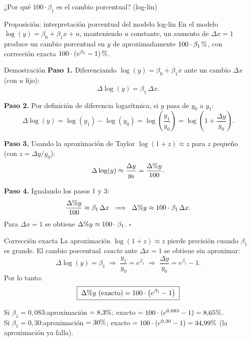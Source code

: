 \documentclass{beamer}
\newcommand{\pc}{\text{\char37}}
\begin{document}
\begin{frame}[allowframebreaks]{¿Por qué $100\cdot\beta_1$ es el cambio porcentual? (log-lin)}

\begin{alertblock}{Proposición: interpretación porcentual del modelo log-lin}
En el modelo $\log(y) = \beta_0 + \beta_1 x + u$, manteniendo $u$ constante, un aumento de $\Delta x = 1$ produce un cambio porcentual en $y$ de aproximadamente $100\cdot\beta_1\,\pc$, con corrección exacta $100\cdot(e^{\beta_1}-1)\,\pc$.
\end{alertblock}

\begin{exampleblock}{Demostración}
\textbf{Paso 1.} Diferenciando $\log(y) = \beta_0 + \beta_1 x$ ante un cambio $\Delta x$ (con $u$ fijo):
\[
\Delta \log(y) = \beta_1\,\Delta x .
\]

\textbf{Paso 2.} Por definición de diferencia logarítmica, si $y$ pasa de $y_0$ a $y_1$:
\[
\Delta \log(y) = \log(y_1) - \log(y_0) = \log\!\left(\frac{y_1}{y_0}\right) = \log\!\left(1 + \frac{\Delta y}{y_0}\right).
\]

\textbf{Paso 3.} Usando la aproximación de Taylor $\log(1+z)\approx z$ para $z$ pequeño (con $z=\Delta y / y_0$):
\[
\Delta \log(y) \approx \frac{\Delta y}{y_0} = \frac{\Delta\pc  y}{100}.
\]

\textbf{Paso 4.} Igualando los pasos 1 y 3:
\[
\frac{\Delta\pc  y}{100} \approx \beta_1 \,\Delta x \;\;\Longrightarrow\;\; \Delta\pc  y \approx 100\cdot\beta_1\,\Delta x .
\]
Para $\Delta x = 1$ se obtiene $\Delta\pc  y \approx 100\cdot\beta_1$. \hfill $\square$
\end{exampleblock}

\framebreak

\begin{block}{Corrección exacta}
La aproximación $\log(1+z)\approx z$ pierde precisión cuando $\beta_1$ es grande. El cambio porcentual \emph{exacto} ante $\Delta x = 1$ se obtiene sin aproximar:
\[
\Delta \log(y) = \beta_1 \;\Longrightarrow\; \frac{y_1}{y_0} = e^{\beta_1}
\;\Longrightarrow\; \frac{\Delta y}{y_0} = e^{\beta_1} - 1 .
\]
Por lo tanto:
\[
\boxed{\;\Delta\pc  y \text{ (exacto)} = 100\cdot\left(e^{\beta_1}-1\right)\;}
\]
\end{block}

\begin{tcolorbox}[colback=blue!5!white, colframe=blue!75!black, title=Ejemplo numérico]
Si $\beta_1 = 0{,}083$:\quad aproximación $= 8{,}3\pc$; \quad exacto $= 100\cdot(e^{0{,}083}-1) = 8{,}65\pc$.\\
Si $\beta_1 = 0{,}30$:\quad aproximación $= 30\pc$; \quad exacto $= 100\cdot(e^{0{,}30}-1) = 34{,}99\pc$ (la aproximación ya falla).
\end{tcolorbox}

\end{frame}
\end{document}
